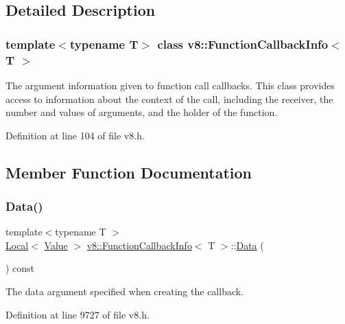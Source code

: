 \subsection{Detailed Description}
\subsubsection*{template$<$typename T$>$\newline
class v8\+::\+Function\+Callback\+Info$<$ T $>$}

The argument information given to function call callbacks. This class provides access to information about the context of the call, including the receiver, the number and values of arguments, and the holder of the function. 

Definition at line 104 of file v8.\+h.



\subsection{Member Function Documentation}
\mbox{\label{classv8_1_1FunctionCallbackInfo_ab0ebfc2ea43af2fdfc3d085272bf499f}} 
\subsubsection{\texorpdfstring{Data()}{Data()}}
{\footnotesize\ttfamily template$<$typename T $>$ \\
\mbox{\hyperlink{classv8_1_1Local}{Local}}$<$ \mbox{\hyperlink{classv8_1_1Value}{Value}} $>$ \mbox{\hyperlink{classv8_1_1FunctionCallbackInfo}{v8\+::\+Function\+Callback\+Info}}$<$ T $>$\+::\mbox{\hyperlink{classv8_1_1Data}{Data}} (\begin{DoxyParamCaption}{ }\end{DoxyParamCaption}) const}

The data argument specified when creating the callback. 

Definition at line 9727 of file v8.\+h.

\mbox{\label{classv8_1_1FunctionCallbackInfo_a7eee713a6f95d5707ce788861754682f}} 
